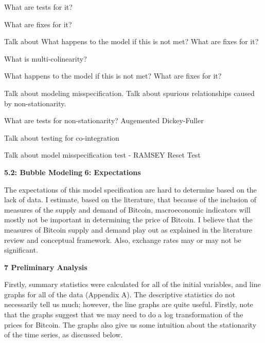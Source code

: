 \documentclass{article}[10 pt]
\newcommand{\vs}{\vspace{0.1in}}
\begin{document}
\vs

What are tests for it? 

\vs

What are fixes for it?

\vs

Talk about What happens to the model if this is not met? What are fixes for it?

\vs

What is multi-colinearity?

\vs

What happens to the model if this is not met? What are fixes for it?

\vs

Talk about modeling misspecification. Talk about spurious relationships
caused by non-stationarity. 

\vs

What are tests for non-stationarity? Augemented Dickey-Fuller

\vs

Talk about testing for co-integration

\vs

Talk about model misspecification test - RAMSEY Reset Test

\vs

\textbf{5.2: Bubble Modeling}
\textbf{6: Expectations}

\vs

The expectations of this model specification are hard to determine based on
the lack of data. I estimate, based on the literature, that because of the
inclusion of measures of the supply and demand of Bitcoin, macroeconomic
indicators will mostly not be important in determining the price of Bitcoin.
I believe that the measures of Bitcoin supply and demand play out as
explained in the literature review and conceptual framework. Also, exchange
rates may or may not be significant.

\vs

\textbf{7 Preliminary Analysis}

\vs

Firstly, summary statistics were calculated for all of the initial
variables, and line graphs for all of the data (Appendix A). The descriptive
statistics do not necessarily tell us much; however, the line graphs are
quite useful. Firstly, note that the graphs suggest that we may need to do
a log transformation of the prices for Bitcoin. The graphs also give us some
intuition about the stationarity of the time series, as discussed below.
\end{document}
